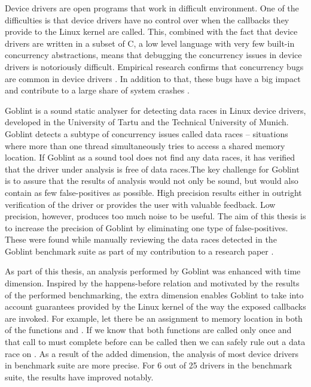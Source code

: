 \documentclass[..thesis.tex]{subfiles}
\begin{document}
 


Device drivers are open programs that work in difficult environment. One of the difficulties is that device drivers have no control over when the callbacks they provide to the Linux kernel
are called. This, combined with the fact that device drivers are written in a subset of C, a low level language with very few built-in concurrency abstractions,
means that debugging the concurrency issues in device drivers is notoriously difficult. Empirical research confirms that concurrency bugs are common in
device drivers \cite{chou_empirical_2001,palix_faults_2011}.  
In addition to that, these bugs have a big impact and contribute to a large share of system crashes \cite{swift_improving_2003}. 


Goblint is a sound static analyser for detecting data races in Linux device drivers, developed in the University of Tartu and the Technical University of Munich. Goblint detects a subtype of concurrency issues called data races -- situations where more than one thread simultaneously tries to access a shared memory location.
If Goblint as a sound tool does not find any data races, it has verified that the driver under analysis is free of data races.The key challenge for Goblint is to assure that the results of analysis would not only be sound, but would also contain as few false-positives as possible. High precision results either in outright verification of the driver or provides the user with valuable feedback. Low precision, however, produces too much noise to be useful. The aim of this thesis is to increase the precision of Goblint by eliminating one type of false-positives. These were found while manually reviewing the data races detected in the Goblint benchmark suite as part of my contribution to a research paper \cite{vojdani_static_2016}.
  

As part of this thesis, an analysis performed by Goblint was enhanced with time dimension. Inspired by the happens-before relation and motivated by the results of the performed benchmarking,
the extra dimension enables Goblint to take into account guarantees provided by the Linux kernel of the way the exposed callbacks are invoked.
For example, let there be an assignment to memory location  in both of the functions  and . 
If we know that both functions are called only once and that call to  must complete before  can be called then we can safely rule out a data race on .
As a result of the added dimension, the analysis of most device drivers in benchmark suite are more precise. For 6 out of 25 drivers in the benchmark suite,
the results have improved notably.
\end{document}
